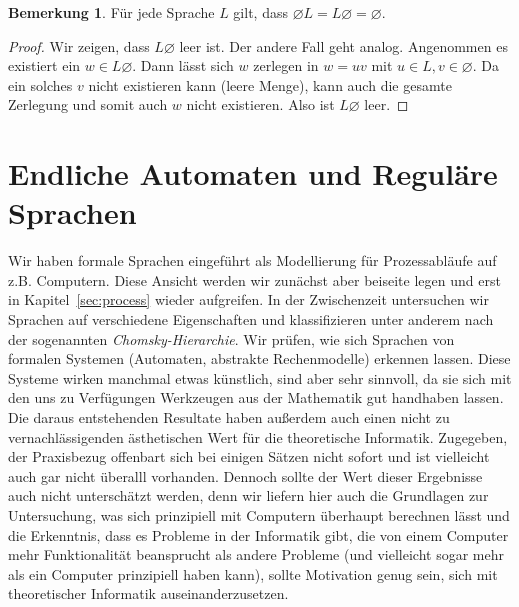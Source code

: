 \documentclass[11pt, a4paper]{article}
\theoremstyle{definition}
\newtheorem*{remark*}{Bemerkung}
\theoremstyle{plain}
\numberwithin{equation}{section}
\let\emptyset\varnothing
\begin{document}
\begin{remark*}
	Für jede Sprache $L$ gilt, dass $\emptyset L = L \emptyset = \emptyset$.
	\begin{proof}
		Wir zeigen, dass $L \emptyset$ leer ist. Der andere Fall geht analog. Angenommen es existiert ein $w \in L \emptyset$. Dann lässt sich $w$ zerlegen in $w = uv$ mit $u \in L, v \in \emptyset$. Da ein solches $v$ nicht existieren kann (leere Menge), kann auch die gesamte Zerlegung und somit auch $w$ nicht existieren. Also ist $L \emptyset$ leer.
	\end{proof}
\end{remark*}



\newpage
\section{Endliche Automaten und Reguläre Sprachen}\label{sec:regular}
Wir haben formale Sprachen eingeführt als Modellierung für Prozessabläufe auf z.B. Computern. Diese Ansicht werden wir zunächst aber beiseite legen und erst in Kapitel~\ref{sec:process} wieder aufgreifen. In der Zwischenzeit untersuchen wir Sprachen auf verschiedene Eigenschaften und klassifizieren unter anderem nach der sogenannten \textit{Chomsky-Hierarchie}. Wir prüfen, wie sich Sprachen von formalen Systemen (Automaten, abstrakte Rechenmodelle) erkennen lassen. Diese Systeme wirken manchmal etwas künstlich, sind aber sehr sinnvoll, da sie sich mit den uns zu Verfügungen Werkzeugen aus der Mathematik gut handhaben lassen. Die daraus entstehenden Resultate haben außerdem auch einen nicht zu vernachlässigenden ästhetischen Wert für die theoretische Informatik. Zugegeben, der Praxisbezug offenbart sich bei einigen Sätzen nicht sofort und ist vielleicht auch gar nicht überalll vorhanden. Dennoch sollte der Wert dieser Ergebnisse auch nicht unterschätzt werden, denn wir liefern hier auch die Grundlagen zur Untersuchung, was sich prinzipiell mit Computern überhaupt berechnen lässt und die Erkenntnis, dass es Probleme in der Informatik gibt, die von einem Computer mehr Funktionalität beansprucht als andere Probleme (und vielleicht sogar mehr als ein Computer prinzipiell haben kann), sollte Motivation genug sein, sich mit theoretischer Informatik auseinanderzusetzen.
\end{document}
